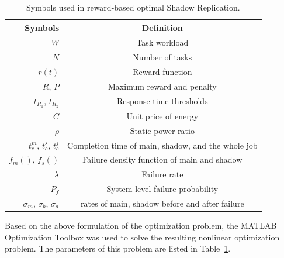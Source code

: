 \begin{table}[!h]
\caption{Symbols used in reward-based optimal Shadow Replication.}
\centering
\begin{tabular}{|r | c |}
\hline 
Symbols                          & Definition                         \\
\hline \hline
$W$                               & Task workload                    \\
\hline
$N$                               & Number of tasks                 \\
\hline
$r(t)$                          & Reward function       \\
\hline
$R$, $P$                            & Maximum reward and penalty      \\
\hline
$t_{R_1}$, $t_{R_2}$             & Response time thresholds  \\
\hline
$C$                               & Unit price of energy            \\
\hline
$\rho$                          & Static power ratio                 \\
\hline
$t_c^m$, $t_c^s$, $t_c^{j}$                 & Completion time of main, shadow, and the whole job \\
\hline
$f_m()$, $f_s()$                    & Failure density function of main and shadow  \\
\hline
$\lambda$                           & Failure rate    \\
\hline
$P_f$                               & System level failure probability \\
\hline
$\sigma_m$, $\sigma_b$, $ \sigma_a$  & rates of main, shadow before and after failure \\
\hline
\end{tabular}

\label{tbl:symbols}
\end{table}

Based on the above formulation of the optimization problem, the
MATLAB Optimization Toolbox was used to solve the
resulting nonlinear optimization problem. The parameters of this
problem are listed in Table~\ref{tbl:symbols}. 


